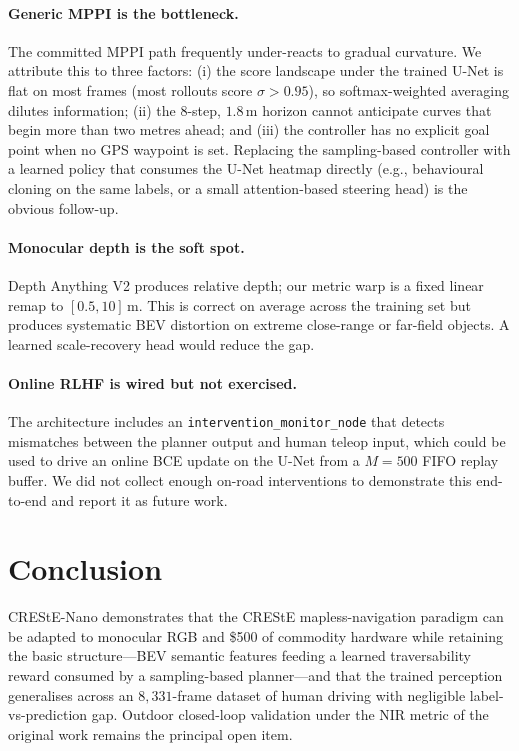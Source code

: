 \documentclass[conference]{IEEEtran}
\newcommand{\sigm}{\sigma}
\begin{document}
\paragraph{Generic MPPI is the bottleneck.}
The committed MPPI path frequently under-reacts to gradual curvature. We
attribute this to three factors: (i) the score landscape under the trained
U-Net is flat on most frames (most rollouts score $\sigm > 0.95$), so
softmax-weighted averaging dilutes information; (ii) the $8$-step,
$1.8$\,m horizon cannot anticipate curves that begin more than two metres
ahead; and (iii) the controller has no explicit goal point when no GPS
waypoint is set. Replacing the sampling-based controller with a learned
policy that consumes the U-Net heatmap directly (e.g., behavioural cloning
on the same labels, or a small attention-based steering head) is the
obvious follow-up.

\paragraph{Monocular depth is the soft spot.}
Depth Anything V2 produces relative depth; our metric warp is a fixed
linear remap to $[0.5, 10]$\,m. This is correct on average across the
training set but produces systematic BEV distortion on extreme close-range
or far-field objects. A learned scale-recovery head would reduce the gap.

\paragraph{Online RLHF is wired but not exercised.}
The architecture includes an \texttt{intervention\_monitor\_node} that
detects mismatches between the planner output and human teleop input,
which could be used to drive an online BCE update on the U-Net from a
$M = 500$ FIFO replay buffer. We did not collect enough on-road
interventions to demonstrate this end-to-end and report it as future work.

\section{Conclusion}

CREStE-Nano demonstrates that the CREStE mapless-navigation paradigm can be
adapted to monocular RGB and \$500 of commodity hardware while retaining
the basic structure---BEV semantic features feeding a learned traversability
reward consumed by a sampling-based planner---and that the trained
perception generalises across an $8{,}331$-frame dataset of human
driving with negligible label-vs-prediction gap. Outdoor closed-loop
validation under the NIR metric of the original work remains the principal
open item.
\end{document}
